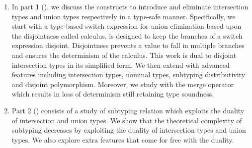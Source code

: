 \begin{enumerate}
  \item { 
          In part 1 (), 
          we discuss the constructs to introduce 
          and eliminate intersection types
          and union types respectively in a type-safe manner.
          Specifically, we start with a type-based switch 
          expression for union elimination based upon the 
          disjointness called \name calculus.
          \name is designed to keep the branches of a switch 
          expression disjoint.
          Disjointness prevents a value to fall in multiple 
          branches and ensures the determinism of the calculus.
          This work is dual to disjoint intersection types
          \citep{oliveira2016disjoint} in its simplified form.
          We then extend \name with advanced features including 
          intersection types, nominal types, subtyping 
          distributivity and disjoint polymorphism.
          Moreover, we study \name with the merge operator
          which results in loss of
          determinism still retaining type soundness.

  }

  \item{Part 2 () consists of a study of subtyping 
        relation which exploits the duality of 
        intersection and union types. We show 
        that the theoretical complexity of subtyping
        decreases by exploiting the duality of 
        intersection types and union types.
        We also explore extra features that come 
        for free with the duality.
      }
\end{enumerate}


